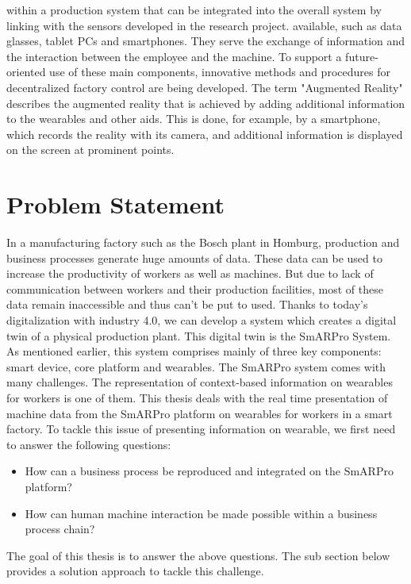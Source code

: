 within a production system that can be integrated into the overall system by linking with the sensors developed in the research project. available, such as data glasses, tablet PCs and smartphones. They serve the exchange of information and the interaction between the employee and the machine. To support a future-oriented use of these main components, innovative methods and procedures for decentralized factory control are being developed.
The term "Augmented Reality" describes the augmented reality that is achieved by adding additional information to the wearables and other aids. This is done, for example, by a smartphone, which records the reality with its camera, and additional information is displayed on the screen at prominent points.

\section{Problem Statement}
In a manufacturing factory such as the Bosch plant in Homburg, production and business processes generate huge amounts of data. These data can be used to increase the productivity of workers as well as machines. But due to lack of communication between workers and their production facilities, most of these data remain inaccessible and thus can’t be put to used. Thanks to today's digitalization with industry 4.0, we can develop a system which creates a digital twin of a physical production plant. This digital twin is the SmARPro System. As mentioned earlier, this system comprises mainly of three key components: smart device, core platform and wearables.  The SmARPro system comes with many challenges. The representation of context-based information on wearables for workers is one of them. This thesis deals with the real time presentation of machine data from the SmARPro platform on wearables for workers in a smart factory. To tackle this issue of presenting information on wearable, we first need to answer the following questions:
\begin{itemize}
\item How can a business process be reproduced and integrated on the SmARPro platform?
\item How can human machine interaction be made possible within a business process chain?
\end{itemize}
	
The goal of this thesis is to answer the above questions. The sub section below provides a solution approach to tackle this challenge.


